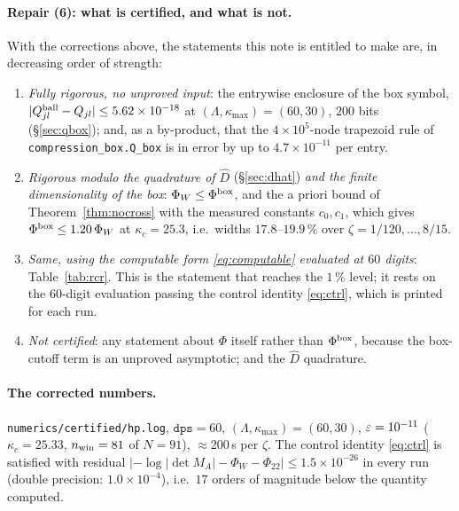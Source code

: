 \documentclass[11pt]{article}
\begin{document}
\paragraph{Repair (6): what is certified, and what is not.}  With the corrections above, the
statements this note is entitled to make are, in decreasing order of strength:
\begin{enumerate}[label=(C\arabic*),leftmargin=2.4em]
\item \emph{Fully rigorous, no unproved input}: the entrywise enclosure of the box symbol,
 $|Q^{\rm ball}_{jl}-Q_{jl}|\le5.62\times10^{-18}$ at $(\Lambda,\kappa_{\max})=(60,30)$,
 $200$ bits (\S\ref{sec:qbox}); and, as a by-product, that the $4\times10^5$-node trapezoid rule of
 \texttt{compression\_box.Q\_box} is in error by up to $4.7\times10^{-11}$ per entry.
\item \emph{Rigorous modulo the quadrature of $\widehat D$} (\S\ref{sec:dhat}) \emph{and the finite
 dimensionality of the box}: $\Phi_W\le\Phi^{\rm box}$, and the a priori bound of
 Theorem~\ref{thm:nocross} with the measured constants $c_0,c_1$, which gives
 $\Phi^{\rm box}\le1.20\,\Phi_W$ at $\kappa_c=25.3$, i.e.\ widths $17.8$--$19.9\,\%$ over
 $\zeta=1/120,\dots,8/15$.
\item \emph{Same, using the computable form \eqref{eq:computable} evaluated at $60$ digits}:
 Table~\ref{tab:rcr}.  This is the statement that reaches the $1\,\%$ level; it rests on the
 $60$-digit evaluation passing the control identity \eqref{eq:ctrl}, which is printed for each run.
\item \emph{Not certified}: any statement about $\Phi$ itself rather than $\Phi^{\rm box}$, because
 the box-cutoff term is an unproved asymptotic; and the $\widehat D$ quadrature.
\end{enumerate}

\paragraph{The corrected numbers.}  \texttt{numerics/certified/hp.log}, $\mathtt{dps}=60$,
$(\Lambda,\kappa_{\max})=(60,30)$, $\varepsilon=10^{-11}$ ($\kappa_c=25.33$, $n_{\rm win}=81$ of $N=91$),
$\approx200$\,s per $\zeta$.  The control identity \eqref{eq:ctrl} is satisfied with residual
$|{-\log|\det M_A|}-\Phi_W-\Phi_{22}|\le1.5\times10^{-26}$ in every run (double precision:
$1.0\times10^{-4}$), i.e.\ $17$ orders of magnitude below the quantity computed.
\end{document}

